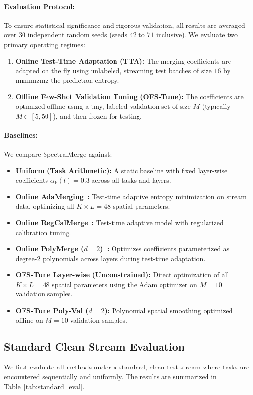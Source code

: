 \paragraph{Evaluation Protocol:}
To ensure statistical significance and rigorous validation, all results are averaged over $30$ independent random seeds (seeds $42$ to $71$ inclusive). We evaluate two primary operating regimes:
\begin{enumerate}
    \item \textbf{Online Test-Time Adaptation (TTA):} The merging coefficients are adapted on the fly using unlabeled, streaming test batches of size $16$ by minimizing the prediction entropy.
    \item \textbf{Offline Few-Shot Validation Tuning (OFS-Tune):} The coefficients are optimized offline using a tiny, labeled validation set of size $M$ (typically $M \in [5, 50]$), and then frozen for testing.
\end{enumerate}

\paragraph{Baselines:}
We compare SpectralMerge against:
\begin{itemize}
    \item \textbf{Uniform (Task Arithmetic):} A static baseline with fixed layer-wise coefficients $\alpha_k(l) = 0.3$ across all tasks and layers.
    \item \textbf{Online AdaMerging~\cite{adamerging}:} Test-time adaptive entropy minimization on stream data, optimizing all $K \times L = 48$ spatial parameters.
    \item \textbf{Online RegCalMerge~\cite{regcalmerge}:} Test-time adaptive model with regularized calibration tuning.
    \item \textbf{Online PolyMerge ($d=2$)~\cite{polymerge}:} Optimizes coefficients parameterized as degree-2 polynomials across layers during test-time adaptation.
    \item \textbf{OFS-Tune Layer-wise (Unconstrained):} Direct optimization of all $K \times L = 48$ spatial parameters using the Adam optimizer on $M=10$ validation samples.
    \item \textbf{OFS-Tune Poly-Val ($d=2$):} Polynomial spatial smoothing optimized offline on $M=10$ validation samples.
\end{itemize}

\subsection{Standard Clean Stream Evaluation}
We first evaluate all methods under a standard, clean test stream where tasks are encountered sequentially and uniformly. The results are summarized in Table~\ref{tab:standard_eval}.

